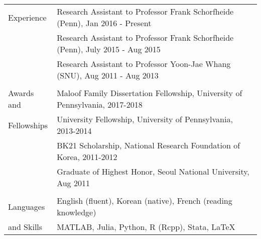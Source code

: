 \documentclass[letterpaper,11pt,oneside]{article}
\begin{document}
\begin{tabular}{@{} l l}
     \Large{Experience}  & Research Assistant to Professor Frank Schorfheide (Penn), Jan 2016 - Present \\
     & Research Assistant to Professor Frank Schorfheide (Penn), July 2015 - Aug 2015\\
     & Research Assistant to Professor Yoon-Jae Whang (SNU), Aug 2011 - Aug 2013\\
     \vspace{0.1in} \\
 \Large{Awards and }    & Maloof Family Dissertation Fellowship, University of Pennsylvania, 2017-2018   \\
  \Large{Fellowships}   & University Fellowship, University of Pennsylvania, 2013-2014  \\
     & BK21 Scholarship, National Research Foundation of Korea, 2011-2012\\
     & Graduate of Highest Honor, Seoul National University, Aug 2011 \\
     \vspace{0.1in} \\
  \Large{Languages}   & English (fluent), Korean (native), French (reading knowledge) \\
\Large{and Skills}    & MATLAB, Julia, Python, R (Rcpp), Stata, \LaTeX \\
\end{tabular}
\end{document}
